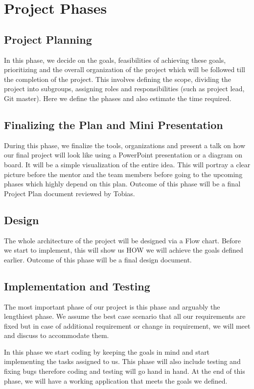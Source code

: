 \documentclass[titlepage]{report}
\begin{document}
\section{Project Phases}
\subsection{Project Planning}
In this phase, we decide on the goals, feasibilities of achieving these goals, prioritizing and the overall organization of the project which will be followed till the completion of the project. This involves defining the scope, dividing the project into subgroups, assigning roles and responsibilities (such as project lead, Git master). Here we define the phases and also estimate the time required. 

\subsection{Finalizing the Plan and Mini Presentation}
During this phase, we finalize the tools, organizations and present a talk on how our final project will look like using a PowerPoint presentation or a diagram on board. It will be a simple visualization of the entire idea. This will portray a clear picture before the mentor and the team members before going to the upcoming phases which highly depend on this plan. Outcome of this phase will be a final Project Plan document reviewed by Tobias. 

\subsection{Design}
The whole architecture of the project will be designed via a Flow chart. Before we start to implement, this will show us HOW we will achieve the goals defined earlier. Outcome of this phase will be a final design document. 

\subsection{Implementation and Testing}
The most important phase of our project is this phase and arguably the lengthiest phase. We assume the best case scenario that all our requirements are fixed but in case of additional requirement or change in requirement, we will meet and discuss to accommodate them. 

In this phase we start coding by keeping the goals in mind and start implementing the tasks assigned to us. This phase will also include testing and fixing bugs therefore coding and testing will go hand in hand. At the end of this phase, we will have a working application that meets the goals we defined. 
\end{document}
